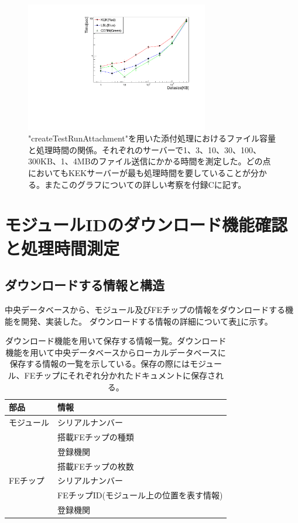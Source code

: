 \begin{figure}[bpt]\centering
  \begin{center}
    \includegraphics[width=8cm,angle=270]{datasize_vs_time_new.pdf}
  \caption["createTestRunAttachment"を用いた添付処理におけるファイル容量と処理時間の関係]{"createTestRunAttachment"を用いた添付処理におけるファイル容量と処理時間の関係。それぞれのサーバーで1、3、10、30、100、300KB、1、4MBのファイル送信にかかる時間を測定した。どの点においてもKEKサーバーが最も処理時間を要していることが分かる。またこのグラフについての詳しい考察を付録Cに記す。}
  \label{datasize_vs_time}
  \end{center}
\end{figure}

\newpage
\section{モジュールIDのダウンロード機能確認と処理時間測定}
\subsection{ダウンロードする情報と構造}
中央データベースから、モジュール及びFEチップの情報をダウンロードする機能を開発、実装した。
ダウンロードする情報の詳細について表\ref{download_information}に示す。

\begin{table}[tbp]
\begin{center}
\caption[ダウンロード機能を用いて保存する情報一覧。]{ダウンロード機能を用いて保存する情報一覧。ダウンロード機能を用いて中央データベースからローカルデータベースに保存する情報の一覧を示している。保存の際にはモジュール、FEチップにそれぞれ分かれたドキュメントに保存される。}
\label{download_information}
  \small
  \begin{tabular}{|ll|} \hline
    部品 & 情報 \\ \hline
    モジュール & シリアルナンバー \\ 
     & 搭載FEチップの種類  \\ 
     & 登録機関  \\ 
     & 搭載FEチップの枚数  \\ \hline 
    FEチップ & シリアルナンバー \\
     & FEチップID(モジュール上の位置を表す情報) \\  
     & 登録機関 \\ \hline 
  \end{tabular}
\end{center}
\end{table}

